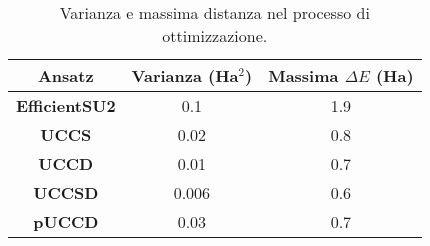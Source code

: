 
\begin{table}[H]
    \centering
    \begin{tabular}{|c|c|c|}
    \hline
    \textbf{Ansatz}                              & \textbf{Varianza (Ha$^2$)} & \textbf{Massima $\Delta E$ (Ha)} \\ \hline
    {\color[HTML]{32CB00} \textbf{EfficientSU2}} & 0.1       & 1.9        \\ \hline
    {\color[HTML]{036400} \textbf{UCCS}}         & 0.02      & 0.8        \\ \hline
    {\color[HTML]{34CDF9} \textbf{UCCD}}         & 0.01      & 0.7        \\ \hline
    {\color[HTML]{3531FF} \textbf{UCCSD}}        & 0.006     & 0.6        \\ \hline
    {\color[HTML]{D952D8} \textbf{pUCCD}}        & 0.03      & 0.7        \\ \hline
\end{tabular}
\caption{Varianza e massima distanza nel processo di ottimizzazione.}
\label{tab:ottimizzazione}
\end{table}
